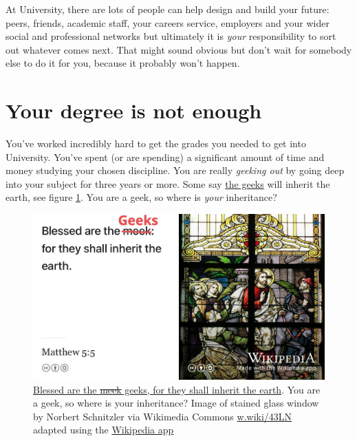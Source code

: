 \documentclass[
]{book}
\begin{document}
At University, there are lots of people can help design and build your future: peers, friends, academic staff, your careers service, employers and your wider social and professional networks but ultimately it is \emph{your} responsibility to sort out whatever comes next. That might sound obvious but don't wait for somebody else to do it for you, because it probably won't happen.

\hypertarget{entitled}{%
\section{Your degree is not enough}\label{entitled}}

You've worked incredibly hard to get the grades you needed to get into University. You've spent (or are spending) a significant amount of time and money studying your chosen discipline. You are really \emph{geeking out} by going deep into your subject for three years or more. Some say \href{https://en.wikipedia.org/wiki/Geek}{the geeks} will inherit the earth, see figure \ref{fig:geekout-fig}. You are a geek, so where is \emph{your} inheritance?

\begin{figure}

{\centering \includegraphics[width=0.99\linewidth]{images/blessed-are-the-geeks} 

}

\caption{\href{https://en.wikipedia.org/wiki/Matthew_5:5}{Blessed are the \sout{meek} geeks, for they shall inherit the earth}. \citep{blessed} You are a geek, so where is your inheritance? Image of stained glass window by Norbert Schnitzler via Wikimedia Commons \href{https://w.wiki/43LN}{w.wiki/43LN} adapted using the \href{https://apps.apple.com/us/app/wikipedia/id324715238}{Wikipedia app}}\label{fig:geekout-fig}
\end{figure}
\end{document}
